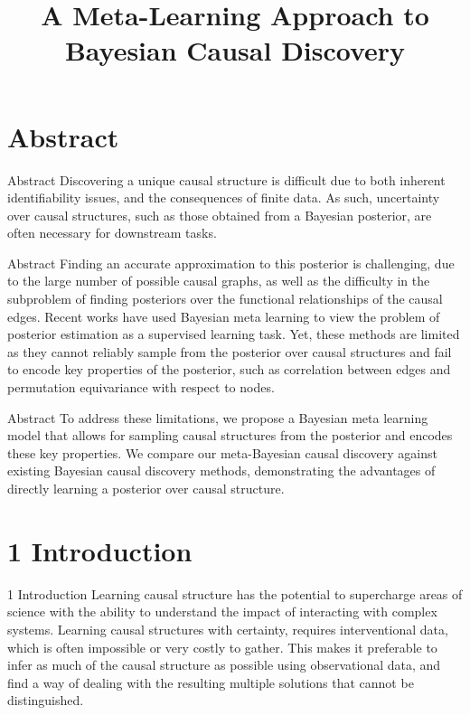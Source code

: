 \documentclass[aspectratio=169,10pt]{beamer}
\title{A Meta-Learning Approach to Bayesian Causal Discovery}
\subtitle{}
\author{\cit{Dhir, Ashman, Requeima, van der Wilk '25}}
\date{}
\begin{document}
\maketitle

\section{Abstract}

\begin{frame}{Abstract}
Discovering a unique causal structure is difficult due to both inherent identifiability issues, and the consequences of finite data. As such, uncertainty over causal structures, such as those obtained from a Bayesian posterior, are often necessary for downstream tasks.
\end{frame}

\begin{frame}{Abstract}
Finding an accurate approximation to this posterior is challenging, due to the large number of possible causal graphs, as well as the difficulty in the subproblem of finding posteriors over the functional relationships of the causal edges. Recent works have used Bayesian meta learning to view the problem of posterior estimation as a supervised learning task. Yet, these methods are limited as they cannot reliably sample from the posterior over causal structures and fail to encode key properties of the posterior, such as correlation between edges and permutation equivariance with respect to nodes.
\end{frame}

\begin{frame}{Abstract}
To address these limitations, we propose a Bayesian meta learning model that allows for sampling causal structures from the posterior and encodes these key properties. We compare our meta-Bayesian causal discovery against existing Bayesian causal discovery methods, demonstrating the advantages of directly learning a posterior over causal structure.
\end{frame}

\section{1 Introduction}

\begin{frame}{1 Introduction}
Learning causal structure has the potential to supercharge areas of science with the ability to understand the impact of interacting with complex systems. Learning causal structures with certainty, requires interventional data, which is often impossible or very costly to gather. This makes it preferable to infer as much of the causal structure as possible using observational data, and find a way of dealing with the resulting multiple solutions that cannot be distinguished.
\end{frame}
\end{document}
